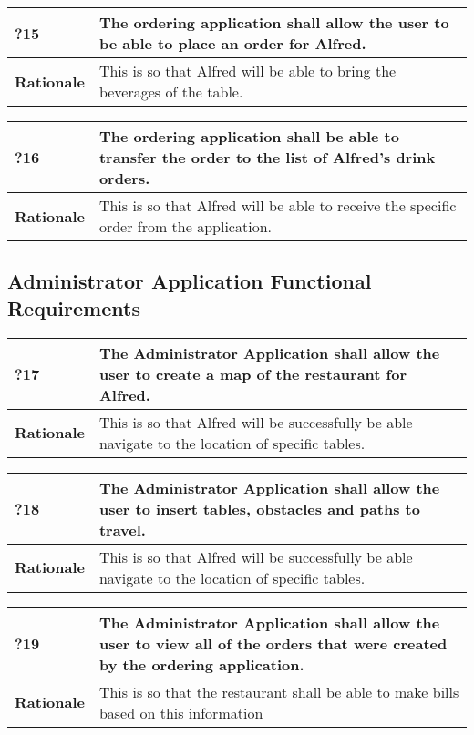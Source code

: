 \documentclass [11pt]{article}
\begin{document}
\begin{longtable}{| p{ } | p{ } | }\hline 
	\rowcolor{tableCell}\textbf{?15} & The ordering application shall allow the user to be able to place an order for Alfred. \\ \hline
	\textbf{Rationale} &  This is so that Alfred will be able to bring the beverages of the table.\\ \hline 
\end{longtable}


\begin{longtable}{| p{ } | p{ } | }\hline 
	\rowcolor{tableCell}\textbf{?16} & The ordering application shall be able to transfer the order to the list of Alfred's drink orders. \\ \hline
	\textbf{Rationale} &  This is so that Alfred will be able to receive the specific order from the application.\\ \hline 
\end{longtable}

\subsection{Administrator Application Functional Requirements}

\begin{longtable}{| p{ } | p{ } | }\hline 
	\rowcolor{tableCell}\textbf{?17} & The Administrator Application shall allow the user to create a map of the restaurant for Alfred. \\ \hline
	\textbf{Rationale} &  This is so that Alfred will be successfully be able navigate to the location of specific tables.\\ \hline 
\end{longtable}

\begin{longtable}{| p{ } | p{ } | }\hline 
	\rowcolor{tableCell}\textbf{?18} & The Administrator Application shall allow the user to insert tables, obstacles and paths to travel. \\ \hline
	\textbf{Rationale} &  This is so that Alfred will be successfully be able navigate to the location of specific tables.\\ \hline 
\end{longtable}

\begin{longtable}{| p{ } | p{ } | }\hline 
	\rowcolor{tableCell}\textbf{?19} & The Administrator Application shall allow the user to view all of the orders that were created by the ordering application. \\ \hline
	\textbf{Rationale} &  This is so that the restaurant shall be able to make bills based on this information\\ \hline 
\end{longtable}
\end{document}
